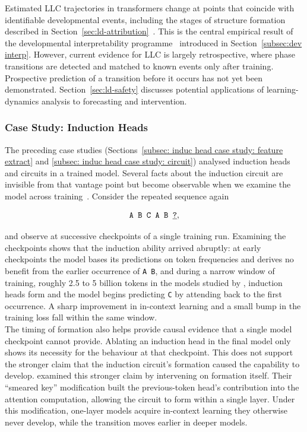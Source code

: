 Estimated LLC trajectories in transformers change at points that coincide with identifiable developmental events, including the stages of structure formation described in Section~\ref{sec:ld-attribution}~. This is the central empirical result of the developmental interpretability programme~ introduced in Section~\ref{subsec:dev interp}. However, current evidence for LLC is largely retrospective, where phase transitions are detected and matched to known events only after training. Prospective prediction of a transition before it occurs has not yet been demonstrated. Section~\ref{sec:ld-safety} discusses potential applications of learning-dynamics analysis to forecasting and intervention.

\subsubsection{Case Study: Induction Heads}
\label{sec:ld-induction-case}

\begin{examplebox}
The preceding case studies (Sections~\ref{subsec: induc head case study: feature extract} and \ref{subsec: induc head case study: circuit}) analysed induction heads and circuits in a trained model. Several facts about the induction circuit are invisible from that vantage point but become observable when we examine the model across training~. Consider the repeated sequence again

\[
\texttt{A B C A B \underline{?}},
\]

and observe at successive checkpoints of a single training run. Examining the checkpoints shows that the induction ability arrived abruptly: at early checkpoints the model bases its predictions on token frequencies and derives no benefit from the earlier occurrence of \texttt{A B}, and during a narrow window of training, roughly 2.5 to 5 billion tokens in the models studied by , induction heads form and the model begins predicting \texttt{C} by attending back to the first occurrence. A sharp improvement in in-context learning and a small bump in the training loss fall within the same window.\\

The timing of formation also helps provide causal evidence that a single model checkpoint cannot provide. Ablating an induction head in the final model only shows its necessity for the behaviour at that checkpoint. This does not support the stronger claim that the induction circuit's formation caused the capability to develop.  examined this stronger claim by intervening on formation itself. Their ``smeared key'' modification built the previous-token head's contribution into the attention computation, allowing the circuit to form within a single layer. Under this modification, one-layer models acquire in-context learning they otherwise never develop, while the transition moves earlier in deeper models.
\end{examplebox}

